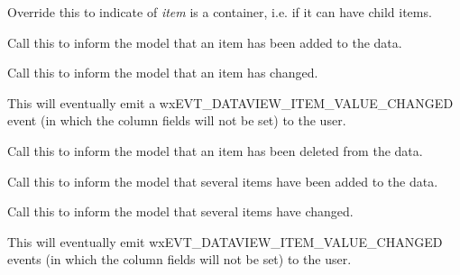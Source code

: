 
Override this to indicate of {\it item} is a container, i.e. if
it can have child items.


\label{wxdataviewmodelitemadded}


Call this to inform the model that an item has been added
to the data.


\label{wxdataviewmodelitemchanged}


Call this to inform the model that an item has changed.

This will eventually emit a wxEVT\_DATAVIEW\_ITEM\_VALUE\_CHANGED
event (in which the column fields will not be set) to the user. 


\label{wxdataviewmodelitemdeleted}


Call this to inform the model that an item has been deleted from the data.


\label{wxdataviewmodelitemsadded}


Call this to inform the model that several items have been added
to the data.


\label{wxdataviewmodelitemschanged}


Call this to inform the model that several items have changed.

This will eventually emit wxEVT\_DATAVIEW\_ITEM\_VALUE\_CHANGED
events (in which the column fields will not be set) to the user. 


\label{wxdataviewmodelitemsdeleted}


